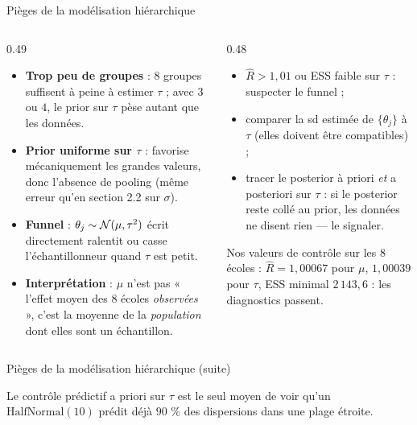 \begin{frame}{Pièges de la modélisation hiérarchique}
\small
\begin{columns}[t]
\begin{column}{0.49\textwidth}
\begin{wbox}
\begin{itemize}
  \item \textbf{Trop peu de groupes} : $8$ groupes suffisent à peine à estimer
        $\tau$ ; avec $3$ ou $4$, le prior sur $\tau$ pèse autant que les données.
  \item \textbf{Prior uniforme sur $\tau$} : favorise mécaniquement les grandes
        valeurs, donc l'absence de pooling (même erreur qu'en section 2.2 sur
        $\sigma$).
  \item \textbf{Funnel} : $\theta_j \sim \mathcal{N}(\mu, \tau^2)$ écrit directement
        ralentit ou casse l'échantillonneur quand $\tau$ est petit.
  \item \textbf{Interprétation} : $\mu$ n'est pas « l'effet moyen des 8 écoles
        \emph{observées} », c'est la moyenne de la \emph{population} dont elles
        sont un échantillon.
\end{itemize}
\end{wbox}
\end{column}
\begin{column}{0.48\textwidth}
\begin{ebox}
\begin{itemize}
  \item $\hat R > 1{,}01$ ou ESS faible sur $\tau$ : suspecter le funnel ;
  \item comparer la sd estimée de $\{\theta_j\}$ à $\tau$ (elles doivent être
        compatibles) ;
  \item tracer le posterior à priori \emph{et} a posteriori sur $\tau$ : si le
        posterior reste collé au prior, les données ne disent rien — le signaler.
\end{itemize}
Nos valeurs de contrôle sur les 8 écoles : $\hat R = 1{,}00067$ pour $\mu$,
$1{,}00039$ pour $\tau$, ESS minimal $2\,143{,}6$ : les diagnostics passent.
\end{ebox}
\end{column}
\end{columns}
\end{frame}

\begin{frame}{Pièges de la modélisation hiérarchique (suite)}
\begin{kbox}
Le contrôle prédictif a priori sur $\tau$ est le seul moyen de voir qu'un
$\mathrm{HalfNormal}(10)$ prédit déjà $90$ \% des dispersions dans une plage
étroite.
\end{kbox}

\end{frame}

